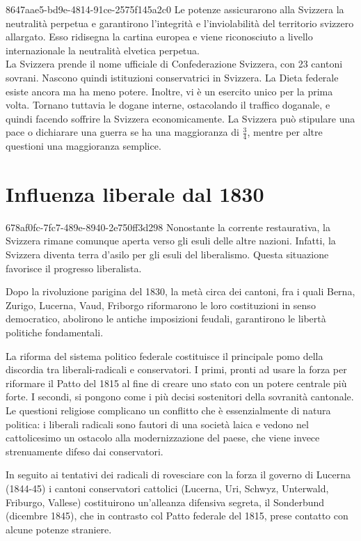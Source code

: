 \documentclass[preview]{standalone}
\begin{document}
\begin{snippet}{8647aae5-bd9e-4814-91ce-2575f145a2c0}
    Le potenze assicurarono alla Svizzera la neutralità perpetua e garantirono
    l'integrità e l'inviolabilità del territorio svizzero allargato.
    Esso ridisegna la cartina europea e viene riconosciuto a livello internazionale la neutralità elvetica perpetua.
    \\
    La Svizzera prende il nome ufficiale di Confederazione Svizzera, con 23 cantoni sovrani.
    Nascono quindi istituzioni conservatrici in Svizzera.
    La Dieta federale esiste ancora ma ha meno potere.
    Inoltre, vi è un esercito unico per la prima volta.
    Tornano tuttavia le dogane interne, ostacolando il traffico doganale, e quindi facendo
    soffrire la Svizzera economicamente.
    La Svizzera può stipulare una pace o dichiarare una guerra se ha una maggioranza di \(\frac{3}{4}\),
    mentre per altre questioni una maggioranza semplice.
\end{snippet}

\section{Influenza liberale dal 1830}

\begin{snippet}{678af0fc-7fc7-489e-8940-2e750ff3d298}
    Nonostante la corrente restaurativa, la Svizzera rimane
    comunque aperta verso gli esuli delle altre nazioni.
    Infatti, la Svizzera diventa terra d'asilo per gli esuli del liberalismo.
    Questa situazione favorisce il progresso liberalista.
    
    Dopo la rivoluzione parigina del 1830, la metà circa dei cantoni, fra i quali Berna, Zurigo,
    Lucerna, Vaud, Friborgo riformarono le loro costituzioni in senso democratico,
    abolirono le antiche imposizioni feudali, garantirono le libertà politiche fondamentali.
    
    La riforma del sistema politico federale costituisce il principale pomo della discordia
    tra liberali-radicali e conservatori. I primi, pronti ad usare la forza per riformare il Patto
    del 1815 al fine di creare uno stato con un potere centrale più forte. I secondi, si
    pongono come i più decisi sostenitori della sovranità cantonale. Le questioni religiose
    complicano un conflitto che è essenzialmente di natura politica: i liberali radicali sono
    fautori di una società laica e vedono nel cattolicesimo un ostacolo alla modernizzazione
    del paese, che viene invece strenuamente difeso dai conservatori.
    
    In seguito ai tentativi dei radicali di rovesciare con la forza il governo di Lucerna (1844-45)
    i cantoni conservatori cattolici (Lucerna, Uri, Schwyz, Unterwald, Friburgo, Vallese)
    costituirono un'alleanza difensiva segreta, il Sonderbund (dicembre 1845), che in
    contrasto col Patto federale del 1815, prese contatto con alcune potenze straniere.
\end{snippet}
\end{document}
